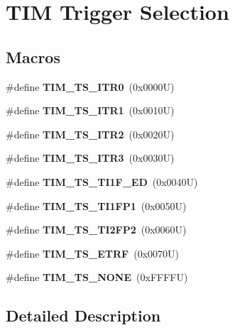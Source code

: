 \hypertarget{group___t_i_m___trigger___selection}{}\section{T\+IM Trigger Selection}
\label{group___t_i_m___trigger___selection}
\subsection*{Macros}
\begin{DoxyCompactItemize}
\item 
\mbox{\label{group___t_i_m___trigger___selection_gab7cf2b7db3956d4fd1e5a5d84f4891e7}} 
\#define {\bfseries T\+I\+M\+\_\+\+T\+S\+\_\+\+I\+T\+R0}~(0x0000\+U)
\item 
\mbox{\label{group___t_i_m___trigger___selection_gad90fbca297153ca9c0112a67ea2c6cb3}} 
\#define {\bfseries T\+I\+M\+\_\+\+T\+S\+\_\+\+I\+T\+R1}~(0x0010\+U)
\item 
\mbox{\label{group___t_i_m___trigger___selection_ga8599ba58a5f911d648503c7ac55d4320}} 
\#define {\bfseries T\+I\+M\+\_\+\+T\+S\+\_\+\+I\+T\+R2}~(0x0020\+U)
\item 
\mbox{\label{group___t_i_m___trigger___selection_ga63183e611b91c5847040172c0069514d}} 
\#define {\bfseries T\+I\+M\+\_\+\+T\+S\+\_\+\+I\+T\+R3}~(0x0030\+U)
\item 
\mbox{\label{group___t_i_m___trigger___selection_ga8c89554efc693e679c94b5a749af123c}} 
\#define {\bfseries T\+I\+M\+\_\+\+T\+S\+\_\+\+T\+I1\+F\+\_\+\+ED}~(0x0040\+U)
\item 
\mbox{\label{group___t_i_m___trigger___selection_ga38d3514d54bcdb0ea8ac8bd91c5832b5}} 
\#define {\bfseries T\+I\+M\+\_\+\+T\+S\+\_\+\+T\+I1\+F\+P1}~(0x0050\+U)
\item 
\mbox{\label{group___t_i_m___trigger___selection_ga0ed58a269bccd3f22d19cc9a2ba3123f}} 
\#define {\bfseries T\+I\+M\+\_\+\+T\+S\+\_\+\+T\+I2\+F\+P2}~(0x0060\+U)
\item 
\mbox{\label{group___t_i_m___trigger___selection_gaece08e02e056613a882aa7ff0a6ccc2d}} 
\#define {\bfseries T\+I\+M\+\_\+\+T\+S\+\_\+\+E\+T\+RF}~(0x0070\+U)
\item 
\mbox{\label{group___t_i_m___trigger___selection_ga257bee9dc9f2f71a73124dd8c2329480}} 
\#define {\bfseries T\+I\+M\+\_\+\+T\+S\+\_\+\+N\+O\+NE}~(0x\+F\+F\+F\+F\+U)
\end{DoxyCompactItemize}


\subsection{Detailed Description}

